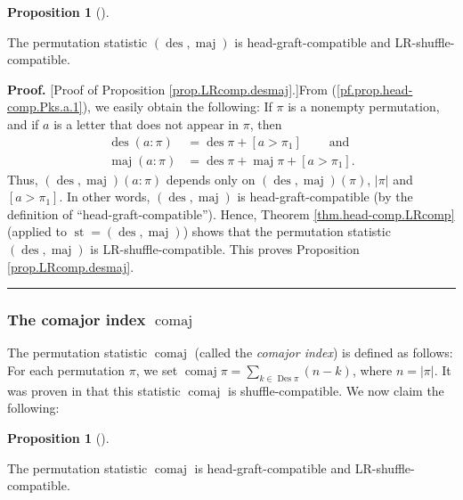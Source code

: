 \documentclass[numbers=enddot,12pt,final,onecolumn,notitlepage]{scrartcl}%
\theoremstyle{definition}
\newtheorem{prop}[theo]{Proposition}
\newenvironment{proposition}[1][]
{\begin{prop}[#1]\begin{leftbar}}
{\end{leftbar}\end{prop}}
\newenvironment{proof}[1][Proof]{\noindent\textbf{#1.} }{\ \rule{0.5em}{0.5em}}
\let\sumnonlimits\sum
\renewcommand{\sum}{\sumnonlimits\limits}
\begin{document}
\begin{proposition}
\label{prop.LRcomp.desmaj}The permutation statistic $\left(
\operatorname*{des},\operatorname*{maj}\right)  $ is head-graft-compatible and LR-shuffle-compatible.
\end{proposition}

\begin{proof}
[Proof of Proposition \ref{prop.LRcomp.desmaj}.]From
(\ref{pf.prop.head-comp.Pks.a.1}), we easily obtain the following: If $\pi$ is
a nonempty permutation, and if $a$ is a letter that does not appear in $\pi$,
then%
\begin{align*}
\operatorname*{des}\left(  a:\pi\right)   &  =\operatorname*{des}\pi+\left[
a>\pi_{1}\right]  \ \ \ \ \ \ \ \ \ \ \text{and}\\
\operatorname*{maj}\left(  a:\pi\right)   &  =\operatorname*{des}%
\pi+\operatorname*{maj}\pi+\left[  a>\pi_{1}\right]  .
\end{align*}
Thus, $\left(  \operatorname*{des},\operatorname*{maj}\right)  \left(
a:\pi\right)  $ depends only on $\left(  \operatorname*{des}%
,\operatorname*{maj}\right)  \left(  \pi\right)  $, $\left\vert \pi\right\vert
$ and $\left[  a>\pi_{1}\right]  $. In other words, $\left(
\operatorname*{des},\operatorname*{maj}\right)  $ is head-graft-compatible (by
the definition of \textquotedblleft head-graft-compatible\textquotedblright).
Hence, Theorem \ref{thm.head-comp.LRcomp} (applied to $\operatorname*{st}%
=\left(  \operatorname*{des},\operatorname*{maj}\right)  $) shows that the
permutation statistic $\left(  \operatorname*{des},\operatorname*{maj}\right)
$ is LR-shuffle-compatible. This proves Proposition \ref{prop.LRcomp.desmaj}.
\end{proof}

\subsubsection{The comajor index $\operatorname*{comaj}$}

The permutation statistic $\operatorname*{comaj}$ (called the \textit{comajor
index}) is defined as follows: For each permutation $\pi$, we set
$\operatorname*{comaj}\pi=\sum_{k\in\operatorname*{Des}\pi}\left(  n-k\right)
$, where $n=\left\vert \pi\right\vert $. It was proven in \cite[\S 3.2]{part1}
that this statistic $\operatorname*{comaj}$ is shuffle-compatible. We now
claim the following:

\begin{proposition}
\label{prop.LRcomp.comaj}The permutation statistic $\operatorname*{comaj}$ is
head-graft-compatible and LR-shuffle-compatible.
\end{proposition}
\end{document}
